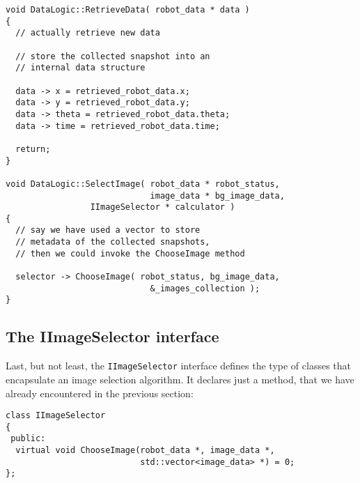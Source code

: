 \begin{lstlisting}[caption={\texttt{IDataLogic} methods skeleton}, label={code:idatalogic_skeleton}, frame=trBL]
void DataLogic::RetrieveData( robot_data * data )
{
  // actually retrieve new data

  // store the collected snapshot into an
  // internal data structure
  
  data -> x = retrieved_robot_data.x;
  data -> y = retrieved_robot_data.y;
  data -> theta = retrieved_robot_data.theta; 
  data -> time = retrieved_robot_data.time;

  return;
}

void DataLogic::SelectImage( robot_data * robot_status, 
                             image_data * bg_image_data,
			     IImageSelector * calculator )
{
  // say we have used a vector to store 
  // metadata of the collected snapshots, 
  // then we could invoke the ChooseImage method

  selector -> ChooseImage( robot_status, bg_image_data, 
                             &_images_collection );
}
\end{lstlisting}


\subsection{The IImageSelector interface}
\label{rear:interfaces:iimageselector}

Last, but not least, the \texttt{IImageSelector} interface
defines the type of classes that encapsulate an image 
selection algorithm. It declares just a method, that 
we have already encountered in the previous section:

\begin{lstlisting}[caption={\texttt{IImageSelector} declaration}, label={code:iimageselector}, frame=trBL]
class IImageSelector
{
 public:
  virtual void ChooseImage(robot_data *, image_data *, 
                           std::vector<image_data> *) = 0;
};
\end{lstlisting}

